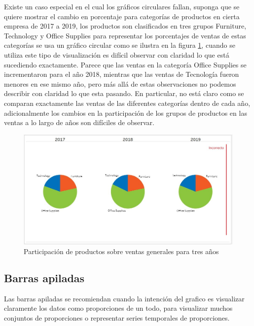 \documentclass[
]{book}
\begin{document}
Existe un caso especial en el cual los gráficos circulares fallan, suponga que se quiere mostrar el cambio en porcentaje para categorías de productos en cierta empresa de 2017 a 2019, los productos son clasificados en tres grupos Furniture, Technology y Office Supplies para representar los porcentajes de ventas de estas categorías se usa un gráfico circular como se ilustra en la figura \ref{fig:circulartiempoincorrecto-fig}, cuando se utiliza este tipo de visualización es difícil observar con claridad lo que está sucediendo exactamente. Parece que las ventas en la categoría Office Supplies se incrementaron para el año 2018, mientras que las ventas de Tecnología fueron menores en ese mismo año, pero más allá de estas observaciones no podemos describir con claridad lo que esta pasando. En particular, no está claro como se comparan exactamente las ventas de las diferentes categorías dentro de cada año, adicionalmente los cambios en la participación de los grupos de productos en las ventas a lo largo de años son difíciles de observar.

\begin{figure}

{\centering \includegraphics[width=1\linewidth]{Imágenes/circularañosincorrecto} 

}

\caption{Participación de productos sobre ventas generales para tres años}\label{fig:circulartiempoincorrecto-fig}
\end{figure}

\hypertarget{barras-apiladas}{%
\subsection{Barras apiladas}\label{barras-apiladas}}

Las barras apiladas se recomiendan cuando la intención del grafico es visualizar claramente los datos como proporciones de un todo, para visualizar muchos conjuntos de proporciones o representar series temporales de proporciones.
\end{document}
